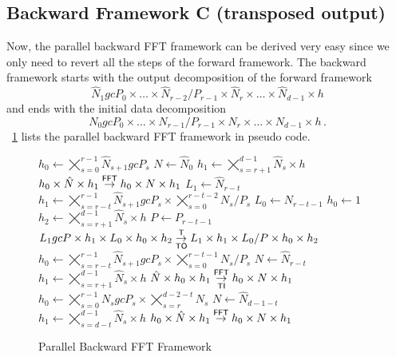 \subsection{Backward Framework C (transposed output)}
Now, the parallel backward FFT framework can be derived very easy since we only need to revert all the steps
of the forward framework. The backward framework starts with the output decomposition of the forward framework
\begin{equation*}
  \hat N_1gcP_0 \times \hdots \times \hat N_{r-2}/P_{r-1} \times \hat N_r \times \hdots \times \hat N_{d-1} \times h
\end{equation*}
and ends with the initial data decomposition
\begin{equation*}
  N_0gcP_0 \times \hdots \times N_{r-1}/P_{r-1} \times N_r \times \hdots \times N_{d-1} \times h\,.
\end{equation*}
\figurename{}~\ref{fig:fft_back} lists the parallel backward FFT framework in pseudo code.
\begin{figure}[ht]
  \begin{algorithmic}[1]
    \State $h_0 \gets \bigtimes_{s=0}^{r-1}\hat N_{s+1}gcP_s$
    \State $N   \gets \hat N_0$
    \State $h_1 \gets \bigtimes_{s=r+1}^{d-1} \hat N_s \times h$
    \State $h_0 \times \hat N \times h_1 \overset{\textsf{FFT}}{\rightarrow} h_0 \times N \times h_1$
      \State $L_1 \gets \hat N_{r-t}$
      \State $h_1 \gets \bigtimes_{s=r-t}^{r-1}\hat N_{s+1}gcP_{s} \times \bigtimes_{s=0}^{r-t-2} N_s/P_s$
      \State $L_0 \gets N_{r-t-1}$
      \State $h_0 \gets 1$
      \State $h_2 \gets \bigtimes_{s=r+1}^{d-1} \hat N_s \times h$
      \State $P   \gets P_{r-t-1}$
      \State $L_1gcP \times h_1 \times L_0 \times h_0 \times h_2\overset{\textsf{T}}{\underset{\textsf{TO}}{\rightarrow}} L_1 \times h_1 \times L_0/P \times h_0 \times h_2$
      \State
      \State $h_0 \gets \bigtimes_{s=r-t}^{r-1} \hat N_{s+1}gcP_s \times \bigtimes_{s=0}^{r-t-1} N_s/P_s$
      \State $N   \gets \hat N_{r-t}$
      \State $h_1 \gets \bigtimes_{s=r+1}^{d-1} \hat N_s \times h$
      \State $\hat N \times h_0 \times h_1 \overset{\textsf{FFT}}{\underset{\textsf{TI}}{\rightarrow}} h_0 \times N \times h_1 $
    \EndFor
      \State $h_0 \gets \bigtimes_{s=0}^{r-1} N_sgcP_s \times \bigtimes_{s=r}^{d-2-t} N_s$
      \State $N   \gets \hat N_{d-1-t}$
      \State $h_1 \gets \bigtimes_{s=d-t}^{d-1} \hat N_s \times h$
      \State $h_0 \times \hat N \times h_1 \overset{\textsf{FFT}}{\rightarrow} h_0 \times N \times h_1$
    \EndFor
  \end{algorithmic}
  \caption{Parallel Backward FFT Framework}\label{fig:fft_back}
\end{figure}

